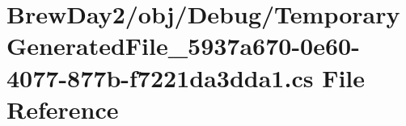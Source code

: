 \hypertarget{_brew_day2_2obj_2_debug_2_temporary_generated_file__5937a670-0e60-4077-877b-f7221da3dda1_8cs}{}\section{Brew\+Day2/obj/\+Debug/\+Temporary\+Generated\+File\+\_\+5937a670-\/0e60-\/4077-\/877b-\/f7221da3dda1.cs File Reference}
\label{_brew_day2_2obj_2_debug_2_temporary_generated_file__5937a670-0e60-4077-877b-f7221da3dda1_8cs}
